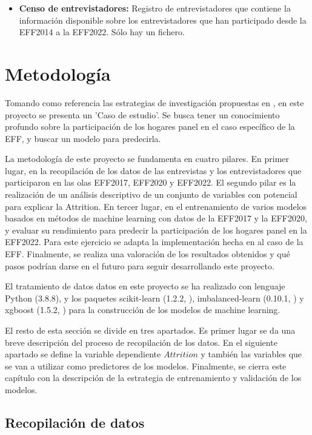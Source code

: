 \begin{itemize}
    \item \textbf{Censo de entrevistadores:} Registro de entrevistadores que contiene la información disponible sobre los entrevistadores que han participado desde la EFF2014 a la EFF2022. Sólo hay un fichero.
\end{itemize}

\section{Metodología}
\label{section:method}

Tomando como referencia las estrategias de investigación propuestas en \cite{oates2022researching}, en este proyecto se presenta un 'Caso de estudio'. Se busca tener un conocimiento profundo sobre la participación de los hogares panel en el caso específico de la EFF, y buscar un modelo para predecirla.

La metodología de este proyecto se fundamenta en cuatro pilares. En primer lugar, en la recopilación de los datos de las entrevistas y los entrevistadores que participaron en las olas EFF2017, EFF2020 y EFF2022. El segundo pilar es la realización de un análisis descriptivo de un conjunto de variables con potencial para explicar la Attrition. En tercer lugar, en el entrenamiento de varios modelos basados en métodos de machine learning con datos de la EFF2017 y la EFF2020, y evaluar su rendimiento para predecir la participación de los hogares panel en la EFF2022. Para este ejercicio se adapta la implementación hecha en \cite{beste2023case} al caso de la EFF. Finalmente, se realiza una valoración de los resultados obtenidos y qué pasos podrían darse en el futuro para seguir desarrollando este proyecto.

El tratamiento de datos datos en este proyecto se ha realizado con lenguaje Python (3.8.8), y los paquetes scikit-learn (1.2.2, \cite{pedregosa2011scikit}), imbalanced-learn (0.10.1, \cite{lemaavztre2017imbalanced}) y xgboost (1.5.2, \cite{chen2016xgboost}) para la construcción de los modelos de machine learning.

El resto de esta sección se divide en tres apartados. Es primer lugar se da una breve descripción del proceso de recopilación de los datos. En el siguiente apartado se define la variable dependiente $Attrition$ y también las variables que se van a utilizar como predictores de los modelos. Finalmente, se cierra este capítulo con la descripción de la estrategia de entrenamiento y validación de los modelos.

\subsection*{Recopilación de datos}

